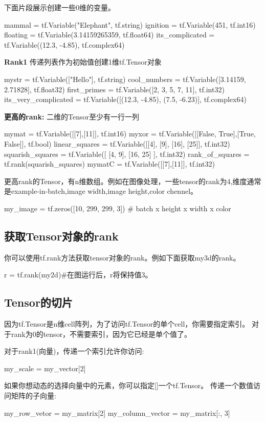 下面片段展示创建一些0维的变量。
\begin{python}
mammal = tf.Variable("Elephant", tf.string)
ignition = tf.Variable(451, tf.int16)
floating = tf.Variable(3.14159265359, tf.float64)
its_complicated = tf.Variable((12.3, -4.85), tf.complex64)
\end{python}
\textbf{Rank1}
传递列表作为初始值创建1维tf.Tensor对象
\begin{python}
mystr = tf.Variable(["Hello"], tf.string)
cool_numbers  = tf.Variable([3.14159, 2.71828], tf.float32)
first_primes = tf.Variable([2, 3, 5, 7, 11], tf.int32)
its_very_complicated = tf.Variable([(12.3, -4.85), (7.5, -6.23)], tf.complex64)
\end{python}
\textbf{更高的rank:}
二维的Tensor至少有一行一列
\begin{python}
mymat = tf.Variable([[7],[11]], tf.int16)
myxor = tf.Variable([[False, True],[True, False]], tf.bool)
linear_squares = tf.Variable([[4], [9], [16], [25]], tf.int32)
squarish_squares = tf.Variable([ [4, 9], [16, 25] ], tf.int32)
rank_of_squares = tf.rank(squarish_squares)
mymatC = tf.Variable([[7],[11]], tf.int32)
\end{python}
更高rank的Tensor，有n维数组。例如在图像处理，一些tensor的rank为4,维度通常是example-in-batch,image width,image height,color chennel。
\begin{python}
my_image = tf.zeros([10, 299, 299, 3])  # batch x height x width x color
\end{python}
\subsection{获取Tensor对象的rank}
你可以使用tf.rank方法获取tensor对象的rank。例如下面获取my3d的rank。
\begin{python}
r = tf.rank(my2d)#在图运行后，r将保持值3。
\end{python}
\subsection{Tensor的切片}
因为tf.Tensor是n维cell阵列，为了访问tf.Tensor的单个cell，你需要指定索引。
对于rank为0的tensor，不需要索引，因为它已经是单个值了。\par
对于rank1(向量)，传递一个索引允许你访问:
\begin{python}
my_scale = my_vector[2]
\end{python}
如果你想动态的选择向量中的元素，你可以指定[]一个tf.Tensor。
传递一个数值访问矩阵的子向量:
\begin{python}
my_row_vetor = my_matrix[2]
my_column_vector = my_matrix[:, 3]
\end{python}
